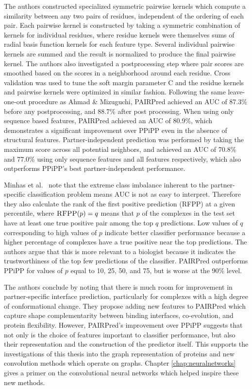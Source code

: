 The authors constructed specialized symmetric pairwise kernels which compute a similarity between any two pairs of residues, independent of the ordering of each pair.
Each pairwise kernel is constructed by taking a symmetric combination of kernels for individual residues, where residue kernels were themselves sums of radial basis function kernels for each feature type.
Several individual pairwise kernels are summed and the result is normalized to produce the final pairwise kernel.
The authors also investigated a postprocessing step where pair scores are smoothed based on the scores in a neighborhood around each residue.
Cross validation was used to tune the soft margin parameter C and the residue kernels and pairwise kernels were optimized in similar fashion. 
Following the same leave-one-out procedure as Ahmad \& Mizuguchi, PAIRPred achieved an AUC of 87.3\% before any postprocessing, and 88.7\% after post processing.
When using only sequence based features, PAIRPred achieved an AUC of 80.9\%, which demonstrates a significant improvement over PPiPP even in the absence of structural features.
Partner-independent prediction was performed by taking the maximum score across all potential neighbors, and achieved an AUC of 70.8\% and 77.0\% using only sequence features and all features respectively, which also outperforms PPiPP's best partner-independent performance.

Minhas et al.~\cite{minhas2014} note that the extreme class imbalance inherent to the partner-specific classification problem means AUC is not as easy to interpret. 
Therefore they also calculate the rank of the first positive prediction (RFPP) at a given percentile, where $\textsc{RFPP}(p) = q$ means that $p$ of the complexes in the test set have at least one true positive pair among the top $q$ predictions.
Low values of $q$ corresponding to high values of $p$ indicate better classifier performance because a higher percentage of complexes have a true positive near the top predictions.
The authors argue that this is more relevant to a biologist because it indicates the trustworthiness of the top few predictions of the classifier. 
PAIRPred outperforms PPiPP for values of $p$ equal to 10, 25, 50, and 75, but is worse at the 90\% level.

The authors conclude by noting that there is much room for improvement in partner-specific interface prediction, particularly for complexes with a high degree of conformational change. 
They propose adding new features to PAIRPred which capture shape complementarity between binding interfaces, co-evolution, and protein flexibility.
However, PAIRPred's improvement over PPiPP suggests that not only is the choice of features important to classifier performance, but also their representation and the construction of the predictor itself.
This supports the investigations of this thesis into the graph representation of proteins and new convolution methods which operate on graphs.
Chapter \ref{chap:neuralnetworks} gives a primer on the convolutional neural networks which helped inspire these new methods.